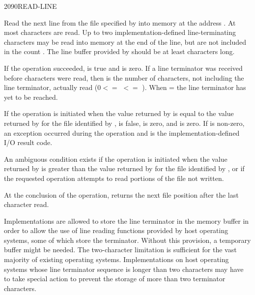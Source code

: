 \begin{worddef}{2090}{READ-LINE}
\item {}

	Read the next line from the file specified by  into
	memory at the address . At most  characters
	are read. Up to two implementation-defined line-terminating
	characters may be read into memory at the end of the line, but
	are not included in the count . The line buffer provided
	by  should be at least  characters long.

	If the operation succeeded,  is true and 
	is zero. If a line terminator was received before 
	characters were read, then  is the number of characters,
	not including the line terminator, actually read ($0 <=$ 
	$<=$ ). When  =  the line
	terminator has yet to be reached.

	If the operation is initiated when the value returned by
	 is equal to the value returned by
	 for the file identified by ,
	 is false,  is zero, and  is zero.
	If  is non-zero, an exception occurred during the
	operation and  is the implementation-defined I/O
	result code.

	An ambiguous condition exists if the operation is initiated when
	the value returned by  is greater than the
	value returned by  for the file identified by
	, or if the requested operation attempts to read
	portions of the file not written.

	At the conclusion of the operation,  returns
	the next file position after the last character read.

	\begin{defer}
	\rationale %
		Implementations are allowed to store the line terminator in
		the memory buffer in order to allow the use of line reading
		functions provided by host operating systems, some of which
		store the terminator. Without this provision, a temporary
		buffer might be needed. The two-character limitation is
		sufficient for the vast majority of existing operating
		systems. Implementations on host operating systems whose line
		terminator sequence is longer than two characters may have to
		take special action to prevent the storage of more than two
		terminator characters.


\end{defer}
\end{worddef}
